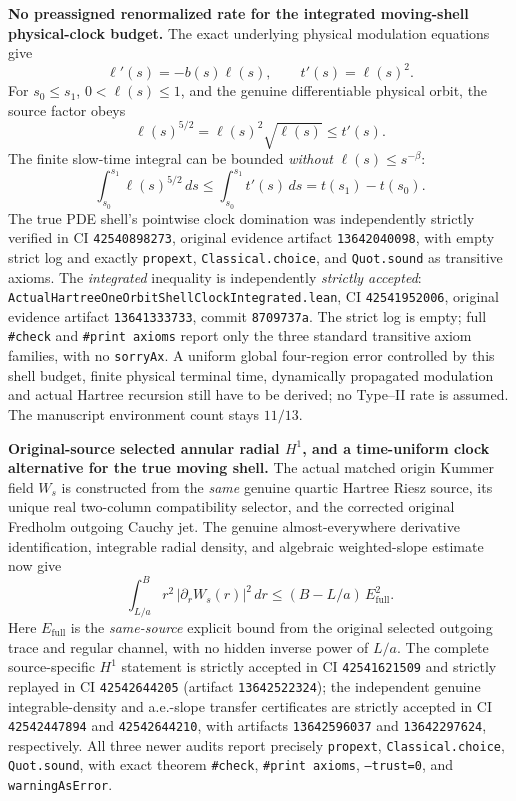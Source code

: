 \documentclass[11pt]{amsart}
\begin{document}
\medskip
\noindent\textbf{No preassigned renormalized rate for the integrated
moving-shell physical-clock budget.}
The exact underlying physical modulation equations give
\[
 \ell'(s)=-b(s)\ell(s),\qquad
 t'(s)=\ell(s)^2.
\]
For \(s_0\le s_1\), \(0<\ell(s)\le1\), and the genuine
differentiable physical orbit, the source factor obeys
\[
 \ell(s)^{5/2}
 =\ell(s)^2\sqrt{\ell(s)}
 \le t'(s).
\]
The finite slow-time integral can be bounded \emph{without}
\(\ell(s)\le s^{-\beta}\):
\[
 \boxed{\quad
 \int_{s_0}^{s_1}\ell(s)^{5/2}\,ds
 \le \int_{s_0}^{s_1}t'(s)\,ds
 =t(s_1)-t(s_0).
 \quad}
\]
The true PDE shell's pointwise clock domination was
independently strictly verified in CI \texttt{42540898273},
original evidence artifact \texttt{13642040098}, with empty
strict log and exactly \texttt{propext},
\texttt{Classical.choice}, and \texttt{Quot.sound} as
transitive axioms. The \emph{integrated} inequality is
independently \emph{strictly accepted}:
\texttt{ActualHartreeOneOrbitShellClockIntegrated.lean},
CI \texttt{42541952006}, original evidence artifact
\texttt{13641333733}, commit \texttt{8709737a}.
The strict log is empty; full \texttt{\#check}
and \texttt{\#print axioms} report only the three standard
transitive axiom families, with no \texttt{sorryAx}.
A uniform global four-region error controlled by this shell
budget, finite physical terminal time, dynamically propagated
modulation and actual Hartree recursion still have to be
derived; no Type--II rate is assumed.
The manuscript environment count stays \(11/13\).



\medskip
\noindent\textbf{Original-source selected annular radial $H^1$,
and a time-uniform clock alternative for the true moving shell.}
The actual matched origin Kummer field $W_s$ is constructed from the
\emph{same} genuine quartic Hartree Riesz source, its unique real
two-column compatibility selector, and the corrected original Fredholm
outgoing Cauchy jet.  The genuine almost-everywhere derivative
identification, integrable radial density, and algebraic weighted-slope
estimate now give
\[
 \int_{L/a}^{B}r^2\,|\partial_r W_s(r)|^2\,dr
 \le (B-L/a)\,E_{\mathrm{full}}^2.
\]
Here $E_{\mathrm{full}}$ is the \emph{same-source} explicit bound
from the original selected outgoing trace and regular channel, with
no hidden inverse power of $L/a$.  The complete source-specific
$H^1$ statement is strictly accepted in CI \texttt{42541621509}
and strictly replayed in CI \texttt{42542644205}
(artifact \texttt{13642522324}); the independent genuine
integrable-density and a.e.-slope transfer certificates are
strictly accepted in CI \texttt{42542447894} and
\texttt{42542644210}, with artifacts \texttt{13642596037}
and \texttt{13642297624}, respectively.  All three newer
audits report precisely \texttt{propext},
\texttt{Classical.choice}, \texttt{Quot.sound},
with exact theorem \texttt{\#check}, \texttt{\#print axioms},
\texttt{--trust=0}, and \texttt{warningAsError}.
\end{document}
